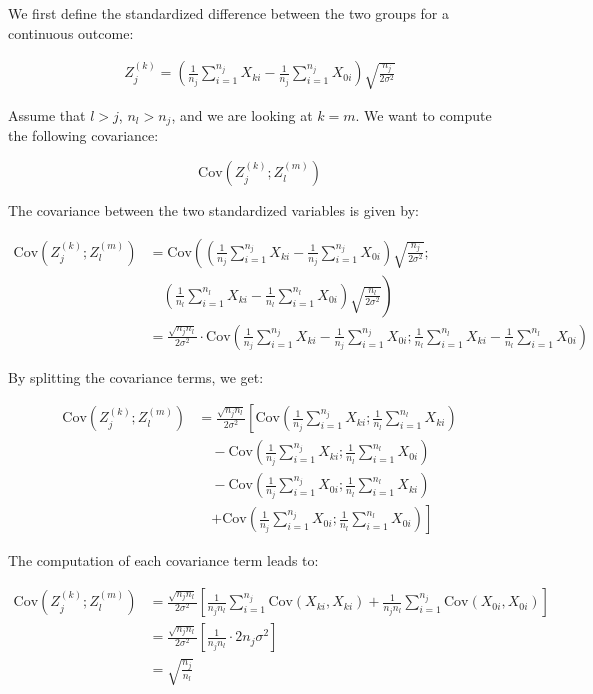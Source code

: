 \documentclass[11pt, a4paper]{article}\usepackage[]{graphicx}\usepackage[]{xcolor}
\begin{document}
We first define the standardized difference between the two groups for a continuous outcome:

\begin{align*}
Z_j^{(k)} = \left(\frac{1}{n_j} \sum_{i=1}^{n_j} X_{ki} - \frac{1}{n_j} \sum_{i=1}^{n_j} X_{0i}\right) \sqrt{\frac{n_j}{2\sigma^2}}
\end{align*}

Assume that \( l > j \), \( n_l > n_j \), and we are looking at \({k = m}\). We want to compute the following covariance:

\[
\text{Cov}\left(Z_j^{(k)}; Z_l^{(m)}\right)
\]

The covariance between the two standardized variables is given by:

\begin{align*}
\text{Cov}\left(Z_j^{(k)}; Z_l^{(m)}\right)
& = \text{Cov}\left( \left( \frac{1}{n_j} \sum_{i=1}^{n_j} X_{ki} - \frac{1}{n_j} \sum_{i=1}^{n_j} X_{0i} \right) \sqrt{\frac{n_j}{2\sigma^2}}; \right. \\
& \quad \left. \left( \frac{1}{n_l} \sum_{i=1}^{n_l} X_{ki} - \frac{1}{n_l} \sum_{i=1}^{n_l} X_{0i} \right) \sqrt{\frac{n_l}{2\sigma^2}} \right) \\
& = \frac{\sqrt{n_j n_l}}{2 \sigma^2} \cdot \text{Cov}\left( \frac{1}{n_j} \sum_{i=1}^{n_j} X_{ki} - \frac{1}{n_j} \sum_{i=1}^{n_j} X_{0i}; \frac{1}{n_l} \sum_{i=1}^{n_l} X_{ki} - \frac{1}{n_l} \sum_{i=1}^{n_l} X_{0i} \right)
\end{align*}

By splitting the covariance terms, we get:

\begin{align*}
\text{Cov}\left(Z_j^{(k)}; Z_l^{(m)}\right)
& = \frac{\sqrt{n_j n_l}}{2 \sigma^2} \left[ \text{Cov}\left( \frac{1}{n_j} \sum_{i=1}^{n_j} X_{ki}; \frac{1}{n_l} \sum_{i=1}^{n_l} X_{ki} \right) \right. \\
& \quad - \text{Cov}\left( \frac{1}{n_j} \sum_{i=1}^{n_j} X_{ki}; \frac{1}{n_l} \sum_{i=1}^{n_l} X_{0i} \right) \\
& \quad - \text{Cov}\left( \frac{1}{n_j} \sum_{i=1}^{n_j} X_{0i}; \frac{1}{n_l} \sum_{i=1}^{n_l} X_{ki} \right) \\
& \quad \left. + \text{Cov}\left( \frac{1}{n_j} \sum_{i=1}^{n_j} X_{0i}; \frac{1}{n_l} \sum_{i=1}^{n_l} X_{0i} \right) \right]
\end{align*}

The computation of each covariance term leads to:

\begin{align*}
\text{Cov}\left(Z_j^{(k)}; Z_l^{(m)}\right)
& = \frac{\sqrt{n_j n_l}}{2 \sigma^2} \left[ \frac{1}{n_j n_l} \sum_{i=1}^{n_j} \text{Cov}\left( X_{ki}, X_{ki} \right) + \frac{1}{n_j n_l} \sum_{i=1}^{n_j} \text{Cov}\left( X_{0i}, X_{0i} \right) \right] \\
& = \frac{\sqrt{n_j n_l}}{2 \sigma^2} \left[ \frac{1}{n_j n_l} \cdot 2n_j \sigma^2 \right] \\
& = \sqrt{\frac{n_j}{n_l}}
\end{align*}
\end{document}
